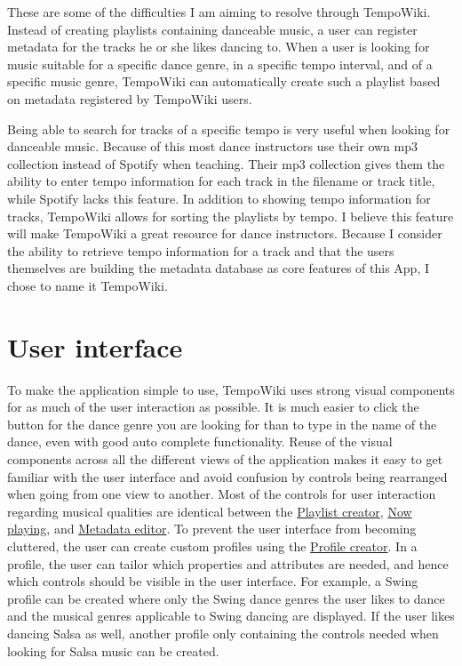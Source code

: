 \documentclass[a4paper, 12pt]{article}
\begin{document}
These are some of the difficulties I am aiming to resolve through TempoWiki. Instead of creating playlists containing danceable music, a user can register metadata for the tracks he or she likes dancing to. When a user is looking for music suitable for a specific dance genre, in a specific tempo interval, and of a specific music genre, TempoWiki can automatically create such a playlist based on metadata registered by TempoWiki users.

Being able to search for tracks of a specific tempo is very useful when looking for danceable music. Because of this most dance instructors use their own mp3 collection instead of Spotify when teaching. Their mp3 collection gives them the ability to enter tempo information for each track in the filename or track title, while Spotify lacks this feature. In addition to showing tempo information for tracks, TempoWiki allows for sorting the playlists by tempo. I believe this feature will make TempoWiki a great resource for dance instructors. Because I consider the ability to retrieve tempo information for a track and that the users themselves are building the metadata database as core features of this App, I chose to name it TempoWiki.

\section{User interface}
\label{sec:user-interface}
To make the application simple to use, TempoWiki uses strong visual components for as much of the user interaction as possible. It is much easier to click the button for the dance genre you are looking for than to type in the name of the dance, even with good auto complete functionality. Reuse of the visual components across all the different views of the application makes it easy to get familiar with the user interface and avoid confusion by controls being rearranged when going from one view to another. Most of the controls for user interaction regarding musical qualities are identical between the \hyperref[sec:playlist]{Playlist creator}, \hyperref[sec:player]{Now playing}, and \hyperref[sec:editor]{Metadata editor}. To prevent the user interface from becoming cluttered, the user can create custom profiles using the \hyperref[sec:profiler]{Profile creator}. In a profile, the user can tailor which properties and attributes are needed, and hence which controls should be visible in the user interface. For example, a Swing profile can be created where only the Swing dance genres the user likes to dance and the musical genres applicable to Swing dancing are displayed. If the user likes dancing Salsa as well, another profile only containing the controls needed when looking for Salsa music can be created.
\end{document}
